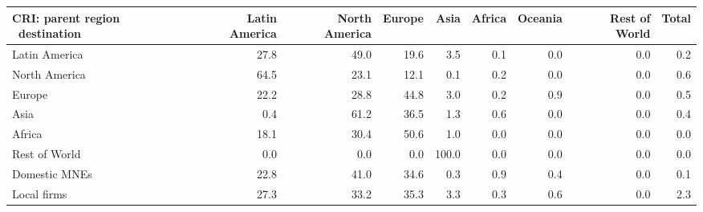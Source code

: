 \begin{tabular}{lrrrrrrrr}
\toprule
CRI: parent region \ destination & Latin America & North America & Europe & Asia & Africa & Oceania & Rest of World & Total \\
\midrule
Latin America & 27.8 & 49.0 & 19.6 & 3.5 & 0.1 & 0.0 & 0.0 & 0.2 \\
North America & 64.5 & 23.1 & 12.1 & 0.1 & 0.2 & 0.0 & 0.0 & 0.6 \\
Europe & 22.2 & 28.8 & 44.8 & 3.0 & 0.2 & 0.9 & 0.0 & 0.5 \\
Asia & 0.4 & 61.2 & 36.5 & 1.3 & 0.6 & 0.0 & 0.0 & 0.4 \\
Africa & 18.1 & 30.4 & 50.6 & 1.0 & 0.0 & 0.0 & 0.0 & 0.0 \\
Rest of World & 0.0 & 0.0 & 0.0 & 100.0 & 0.0 & 0.0 & 0.0 & 0.0 \\
Domestic MNEs & 22.8 & 41.0 & 34.6 & 0.3 & 0.9 & 0.4 & 0.0 & 0.1 \\
Local firms & 27.3 & 33.2 & 35.3 & 3.3 & 0.3 & 0.6 & 0.0 & 2.3 \\
\bottomrule
\end{tabular}
